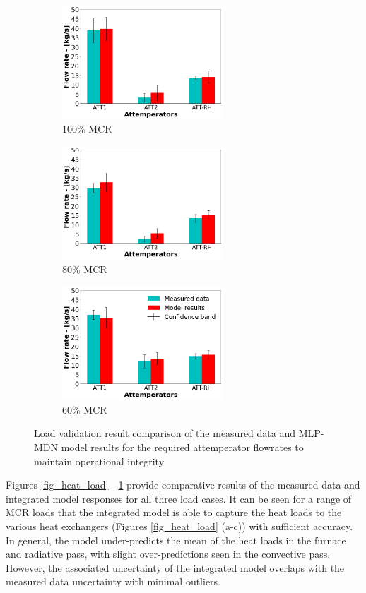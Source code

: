\documentclass[a4paper,fleqn]{cas-dc}
\begin{document}
\begin{figure}
\centering
\begin{subfigure}{0.33\textwidth}
    \includegraphics[width=\linewidth, height = 4.25cm]{100_CASE_ATTEMP}
    \caption{100\% MCR}
\end{subfigure}\hfill %
\begin{subfigure}{0.33\textwidth}
    \includegraphics[width=\linewidth, height = 4.25cm]{80_CASE_ATTEMP}
    \caption{80\% MCR}
\end{subfigure}\hfill
\begin{subfigure}{0.33\textwidth}
    \includegraphics[width=\linewidth, height = 4.25cm]{60_CASE_ATTEMP}
    \caption{60\% MCR}
\end{subfigure}
\caption{Load validation result comparison of the measured data and MLP-MDN model results for the required attemperator flowrates to maintain operational integrity}
\label{fig_attemp}
\end{figure}

Figures \ref{fig_heat_load} - \ref{fig_attemp} provide comparative results of the measured data and integrated model responses for all three load cases. It can be seen for a range of MCR loads that the integrated model is able to capture the heat loads to the various heat exchangers (Figures \ref{fig_heat_load} (a-c)) with sufficient accuracy. In general, the model under-predicts the mean of the heat loads in the furnace and radiative pass, with slight over-predictions seen in the convective pass. However, the associated uncertainty of the integrated model overlaps with the measured data uncertainty with minimal outliers.\\ 
\end{document}
